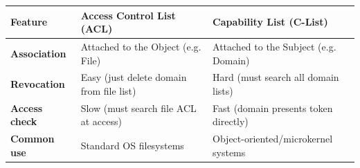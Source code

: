 \documentclass[12pt,a4paper]{article}
\renewcommand{\arraystretch}{1.45}
\begin{document}
\begin{tcolorbox}[tikzbox, title={Security Implementation Comparison}]
\renewcommand{\arraystretch}{1.4}
\par\noindent
\begin{tabularx}{\linewidth}{|B{2.2cm}|>{\small\centering\arraybackslash}X|>{\small\centering\arraybackslash}X|}
\hline
\textbf{Feature} & \textbf{\color{myred}Access Control List (ACL)} & \textbf{\color{myteal}Capability List (C-List)} \\
\hline
\textbf{Association} & Attached to the Object (e.g. File) & Attached to the Subject (e.g. Domain) \\
\hline
\textbf{Revocation} & Easy (just delete domain from file list) & Hard (must search all domain lists) \\
\hline
\textbf{Access check} & Slow (must search file ACL at access) & Fast (domain presents token directly) \\
\hline
\textbf{Common use} & Standard OS filesystems & Object-oriented/microkernel systems \\
\hline
\end{tabularx}
\end{tcolorbox}
\end{document}
